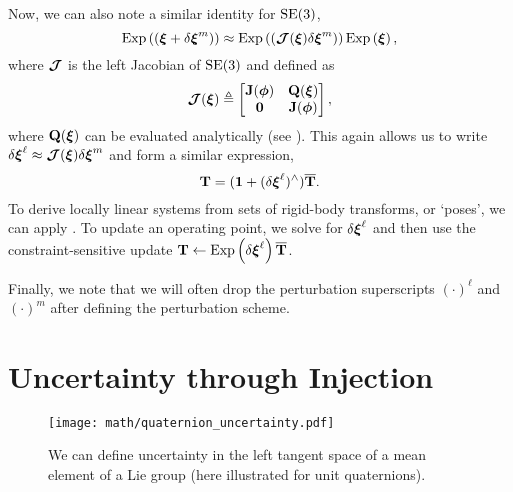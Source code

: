 \noindent Now, we can also note a similar identity for $\mathrm{SE}(3)$,
\begin{equation}
\mathrm{Exp}\left({( \boldsymbol{\mathbf{\xi}} + \delta \boldsymbol{\mathbf{\xi}}^m)}\right) \approx \mathrm{Exp}\left({(\boldsymbol{\mathbf{\mathcal{J}}}(\boldsymbol{\mathbf{\xi}}) \delta \boldsymbol{\mathbf{\xi}}^m)}\right) \mathrm{Exp}\left({\boldsymbol{\mathbf{\xi}}}\right),
\end{equation}
where $\boldsymbol{\mathbf{\mathcal{J}}}$ is the left Jacobian of $\mathrm{SE}(3)$ and defined as
\begin{equation}
\boldsymbol{\mathbf{\mathcal{J}}} (\boldsymbol{\mathbf{\xi}}) \triangleq \begin{bmatrix}  \boldsymbol{\mathbf{J}}(\boldsymbol{\mathbf{\phi}}) & \boldsymbol{\mathbf{Q}}(\boldsymbol{\mathbf{\xi}}) \\ \boldsymbol{\mathbf{0}} & \boldsymbol{\mathbf{J}}(\boldsymbol{\mathbf{\phi}}) \end{bmatrix},
\end{equation}
where $\boldsymbol{\mathbf{Q}}(\boldsymbol{\mathbf{\xi}})$ can be evaluated analytically (see \cite{Barfoot2017-ri}). This again allows us to write $\delta \boldsymbol{\mathbf{\xi}}^\ell \approx \boldsymbol{\mathbf{\mathcal{J}}}(\boldsymbol{\mathbf{\xi}}) \delta \boldsymbol{\mathbf{\xi}}^m$ and form a similar expression,
\begin{equation}
	\label{eq:math_se3_perturbations}
	\boldsymbol{\mathbf{T}} = (\boldsymbol{\mathbf{1}} + (\delta \boldsymbol{\mathbf{\xi}}^\ell)^\wedge) \overline{\boldsymbol{\mathbf{T}}}.
\end{equation}
To derive locally linear systems from sets of rigid-body transforms, or `poses', we can apply . To update an operating point, we solve for $\delta \boldsymbol{\mathbf{\xi}}^\ell$ and then use the constraint-sensitive update $\boldsymbol{\mathbf{T}} \leftarrow \mathrm{Exp}\left({\delta \boldsymbol{\mathbf{\xi}}^\ell}\right) \overline{\boldsymbol{\mathbf{T}}}$.

Finally, we note that we will often drop the perturbation superscripts $(\cdot)^\ell$ and $(\cdot)^m$ after defining the perturbation scheme.

\section{Uncertainty through Injection}


\begin{wrapfigure}{r}{0.35\textwidth}
  \vspace{-20pt}
  \begin{center}
	\texttt{[image: math/quaternion\_uncertainty.pdf]}
  \end{center}
    \vspace{-20pt}
	\label{fig:math_quat_uncertainty}
	\caption{We can define uncertainty in the left tangent space of a mean element of a Lie group (here illustrated for unit quaternions).}
\end{wrapfigure} 


